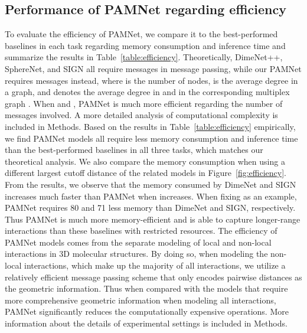 \documentclass[fleqn,10pt]{wlscirep}
\newcommand{\method}{PAMNet\xspace}
\begin{document}
\subsection*{Performance of \method regarding efficiency}
To evaluate the efficiency of \method, we compare it to the best-performed baselines in each task regarding memory consumption and inference time and summarize the results in Table~\ref{table:efficiency}. Theoretically, DimeNet++, SphereNet, and SIGN all require  messages in message passing, while our \method requires  messages instead, where  is the number of nodes,  is the average degree in a graph,  and  denotes the average degree in  and  in the corresponding multiplex graph . When  and , \method is much more efficient regarding the number of messages involved. A more detailed analysis of computational complexity is included in Methods. Based on the results in Table~\ref{table:efficiency} empirically, we find \method models all require less memory consumption and inference time than the best-performed baselines in all three tasks, which matches our theoretical analysis. We also compare the memory consumption when using a different largest cutoff distance  of the related models in Figure~\ref{fig:efficiency}. From the results, we observe that the memory consumed by DimeNet and SIGN increases much faster than \method when  increases. When fixing  as an example, \method requires 80 and 71 less memory than DimeNet and SIGN, respectively. Thus \method is much more memory-efficient and is able to capture longer-range interactions than these baselines with restricted resources. The efficiency of \method models comes from the separate modeling of local and non-local interactions in 3D molecular structures. By doing so, when modeling the non-local interactions, which make up the majority of all interactions, we utilize a relatively efficient message passing scheme that only encodes pairwise distances  as the geometric information. Thus when compared with the models that require more comprehensive geometric information when modeling all interactions, \method significantly reduces the computationally expensive operations. More information about the details of experimental settings is included in Methods.
\end{document}
